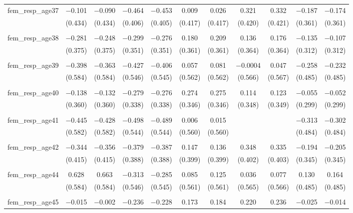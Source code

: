 \begin{table}[!htbp]
\begin{tabular}{@{\extracolsep{5pt}}lcccccccccc}
 fem\_resp\_age37 & $-$0.101 & $-$0.090 & $-$0.464 & $-$0.453 & 0.009 & 0.026 & 0.321 & 0.332 & $-$0.187 & $-$0.174 \\ 
  & (0.434) & (0.434) & (0.406) & (0.405) & (0.417) & (0.417) & (0.420) & (0.421) & (0.361) & (0.361) \\ 
  & & & & & & & & & & \\ 
 fem\_resp\_age38 & $-$0.281 & $-$0.248 & $-$0.299 & $-$0.276 & 0.180 & 0.209 & 0.136 & 0.176 & $-$0.135 & $-$0.107 \\ 
  & (0.375) & (0.375) & (0.351) & (0.351) & (0.361) & (0.361) & (0.364) & (0.364) & (0.312) & (0.312) \\ 
  & & & & & & & & & & \\ 
 fem\_resp\_age39 & $-$0.398 & $-$0.363 & $-$0.427 & $-$0.406 & 0.057 & 0.081 & $-$0.0004 & 0.047 & $-$0.258 & $-$0.232 \\ 
  & (0.584) & (0.584) & (0.546) & (0.545) & (0.562) & (0.562) & (0.566) & (0.567) & (0.485) & (0.485) \\ 
  & & & & & & & & & & \\ 
 fem\_resp\_age40 & $-$0.138 & $-$0.132 & $-$0.279 & $-$0.276 & 0.274 & 0.275 & 0.114 & 0.123 & $-$0.055 & $-$0.052 \\ 
  & (0.360) & (0.360) & (0.338) & (0.338) & (0.346) & (0.346) & (0.348) & (0.349) & (0.299) & (0.299) \\ 
  & & & & & & & & & & \\ 
 fem\_resp\_age41 & $-$0.445 & $-$0.428 & $-$0.498 & $-$0.489 & 0.006 & 0.015 &  &  & $-$0.313 & $-$0.302 \\ 
  & (0.582) & (0.582) & (0.544) & (0.544) & (0.560) & (0.560) &  &  & (0.484) & (0.484) \\ 
  & & & & & & & & & & \\ 
 fem\_resp\_age42 & $-$0.344 & $-$0.356 & $-$0.379 & $-$0.387 & 0.147 & 0.136 & 0.348 & 0.335 & $-$0.194 & $-$0.205 \\ 
  & (0.415) & (0.415) & (0.388) & (0.388) & (0.399) & (0.399) & (0.402) & (0.403) & (0.345) & (0.345) \\ 
  & & & & & & & & & & \\ 
 fem\_resp\_age44 & 0.628 & 0.663 & $-$0.313 & $-$0.285 & 0.085 & 0.125 & 0.036 & 0.077 & 0.130 & 0.164 \\ 
  & (0.584) & (0.584) & (0.546) & (0.545) & (0.561) & (0.561) & (0.565) & (0.566) & (0.485) & (0.485) \\ 
  & & & & & & & & & & \\ 
 fem\_resp\_age45 & $-$0.015 & $-$0.002 & $-$0.236 & $-$0.228 & 0.173 & 0.184 & 0.220 & 0.236 & $-$0.025 & $-$0.014 \\ 

\end{tabular}
\end{table}

